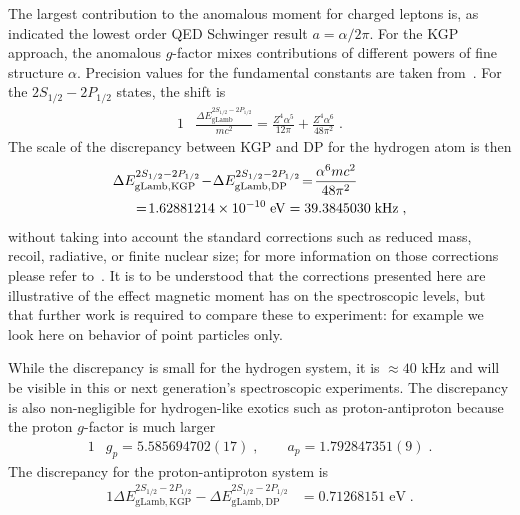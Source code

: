 The largest contribution to the anomalous moment for charged leptons is, as indicated the lowest order QED Schwinger result $a=\alpha/2\pi$. For the KGP approach, the anomalous $g$-factor mixes contributions of different powers of fine structure $\alpha$. Precision values for the fundamental constants are taken from~\cite{Tiesinga:2021myr}. For the $2S_{1/2}-2P_{1/2}$ states, the shift is
\begin{alignat}{1}
\label{lamb04} &\frac{\Delta E_{\mathrm{gLamb}}^{2S_{1/2}-2P_{1/2}}}{mc^{2}}=\frac{Z^{4}\alpha^{5}}{12\pi}+\frac{Z^{4}\alpha^{6}}{48\pi^{2}}\;.
\end{alignat}
The scale of the discrepancy between KGP and DP for the hydrogen atom is then
\begin{alignat}{1}
\label{lamb05} \Delta &E_{\mathrm{gLamb,KGP}}^{2S_{1/2}-2P_{1/2}}\!-\!\Delta E_{\mathrm{gLamb,DP}}^{2S_{1/2}-2P_{1/2}}\!=\!\frac{\alpha^{6}mc^{2}}{48\pi^{2}}\\ \notag&\;\;=\!1.62881214\times10^{-10}\;\mathrm{eV} =39.3845030\;\mathrm{kHz}\;,\end{alignat}
without taking into account the standard corrections such as reduced mass, recoil, radiative, or finite nuclear size; for more information on those corrections please refer to~\cite{Tiesinga:2021myr,Jentschura:1996zz,Eides:2000xc}. It is to be understood that the corrections presented here are illustrative of the effect magnetic moment has on the spectroscopic levels, but that further work is required to compare these to experiment: for example we look here on behavior of point particles only.

While the discrepancy is small for the hydrogen system, it is $\approx 40$ kHz and will be visible in this or next generation\rq s spectroscopic experiments. The discrepancy is also non-negligible for hydrogen-like exotics such as proton-antiproton because the proton $g$-factor is much larger
\begin{alignat}{1}\label{gpaFULL}
&g_p=5.585694702(17)\;,\qquad a_p=1.792847351(9)\;. 
\end{alignat} 
The discrepancy for the proton-antiproton system is
\begin{alignat}{1}
\label{lamb06} \Delta E_{\mathrm{gLamb,KGP}}^{2S_{1/2}-2P_{1/2}}-\Delta E_{\mathrm{gLamb,DP}}^{2S_{1/2}-2P_{1/2}}&=0.71268151\;\mathrm{eV}\;.
\end{alignat} 

